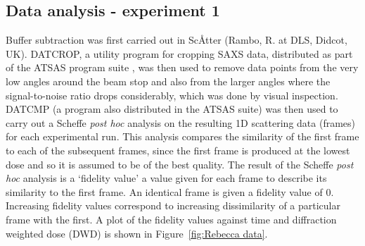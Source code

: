 \subsection{Data analysis - experiment 1}
\label{sub:Data analysis - experiment 1}
Buffer subtraction was first carried out in Sc\AA tter (Rambo, R. at DLS, Didcot, UK).
DATCROP, a utility program for cropping SAXS data, distributed as part of the ATSAS program suite \cite{petoukhov2012new}, was then used to remove data points from the very low angles around the beam stop and also from the larger angles where the signal-to-noise ratio drops considerably, which was done by visual inspection.
DATCMP (a program also distributed in the ATSAS suite) was then used to carry out a Scheffe \textit{post hoc} analysis on the resulting 1D scattering data (frames) for each experimental run.
This analysis compares the similarity of the first frame to each of the subsequent frames, since the first frame is produced at the lowest dose and so it is assumed to be of the best quality.
The result of the Scheffe \textit{post hoc} analysis is a `fidelity value' a value given for each frame to describe its similarity to the first frame.
An identical frame is given a fidelity value of 0.
Increasing fidelity values correspond to increasing dissimilarity of a particular frame with the first.
A plot of the fidelity values against time and diffraction weighted dose (DWD) is shown in Figure~\ref{fig:Rebecca data}.

